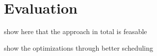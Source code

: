 \chapter{Evaluation}

show here that the approach in total is feasable

show the optimizations through better scheduling
